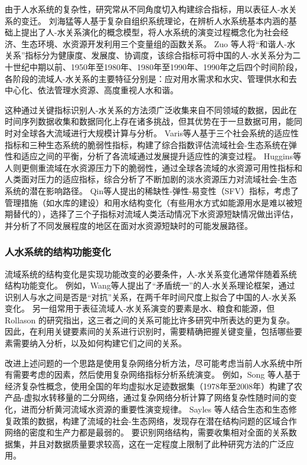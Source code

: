 由于人水系统的复杂性，研究常从不同角度切入构建综合指标，用以表征人-水关系的变迁。
刘海猛等人基于复杂自组织系统理论，在辨析人水系统基本内涵的基础上提出了人-水关系演化的概念模型，将人水系统的演变过程概念化为社会经济、生态环境、水资源开发利用三个变量组的函数关系\cite{liu2014}。
Zuo 等人将“和谐人-水关系”指标分为健康度、发展度、协调度\cite{zuo2008}，该综合指标可将中国的人-水关系分为二十世纪中期以前、1950年至1980年、1980年至1990年、1990年之后四个时间阶段，各阶段的流域人-水关系的主要特征分别是：应对用水需求和水灾、管理供水和去中心化、依法管理水资源、高度重视人水和谐\cite{zuo2016a}。

这种通过关键指标识别人-水关系的方法须广泛收集来自不同领域的数据，因此在时间序列数据收集和数据同化上存在诸多挑战，但其优势在于一旦数据可用，能同时对全球各大流域进行大规模计算与分析。
Varis等人基于三个社会系统的适应性指标和三种生态系统的脆弱性指标，构建了综合指数评估流域社会-生态系统在弹性和适应之间的平衡，分析了各流域通过发展提升适应性的演变过程\cite{varis2019}。
Huggins等人则更侧重流域在水资源压力下的脆弱性，通过全球各流域的水资源可用性指标和人类面对压力的适应指标，综合分析了不断加剧的淡水资源压力对流域社会-生态系统的潜在影响路径\cite{huggins2022}。
Qin等人提出的稀缺性-弹性-易变性（SFV）指标，考虑了管理措施（如水库的建设）和用水结构变化（有些用水方式如能源用水是难以被短期替代的），选择了三个子指标对流域人类活动情况下水资源短缺情况做出评估，并分析了不同发展程度的地区在面对水资源短缺时的可能发展路径\cite{qin2019}。

\subsubsection{人水系统的结构功能变化}

流域系统的结构变化是实现功能改变的必要条件，人-水关系变化通常伴随着系统结构功能变化。
例如，Wang等人提出了“矛盾统一”的人-水关系理论框架，通过识别人与水之间是否是“对抗”关系，在两千年时间尺度上拟合了中国的人-水关系变化\cite{wang2017}。
另一组常用于表征流域人-水关系演变的要素是水、粮食和能源，但 Rollason 的研究指出，这三者之间的关系可能比许多研究中所表达的更为复杂\cite{rollason2021}。
因此，在利用关键要素间的关系进行识别时，需要精确把握关键变量，包括哪些要素需要纳入分析，以及如何构建它们之间的关系\cite{zhangzongyong2020, wang2021}。

改进上述问题的一个思路是使用复杂网络分析方法，尽可能考虑当前人水系统中所有需要考虑的因素，然后使用复杂网络指标分析系统演变\cite{sayles2019, bodin2017b}。
例如，Song 等人基于经济复杂性概念，使用全国的年均虚拟水足迹数据集（1978年至2008年）构建了农产品-虚拟水转移量的二分网络，通过复杂网络分析计算了网络复杂性随时间的变化，进而分析黄河流域水资源的重要性演变规律\cite{song2022}。
Sayles 等人结合生态和生态修复政策的数据，构建了流域的社会-生态网络，发现存在潜在结构问题的区域合作网络的密度和生产力都是最弱的\cite{sayles2017}。
要识别网络结构，需要收集相对全面的关系数据集，并且对数据质量要求较高，这在一定程度上限制了此种研究方法的广泛应用。

